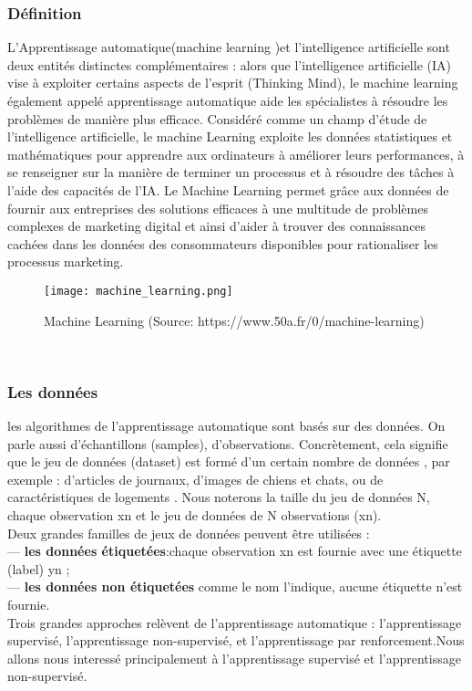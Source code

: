 \documentclass{article}
\begin{document}
\subsubsection{Définition}
L'Apprentissage automatique(machine learning )et l'intelligence artificielle sont deux entités distinctes complémentaires : alors que l'intelligence artificielle (IA) vise à exploiter certains aspects de l'esprit (Thinking Mind), le machine learning également appelé apprentissage automatique aide les spécialistes à résoudre les problèmes de manière plus efficace. Considéré comme un champ d'étude de l'intelligence artificielle, le machine Learning exploite les données statistiques et mathématiques pour apprendre aux ordinateurs à améliorer leurs performances, à se renseigner sur la manière de terminer un processus et à résoudre des tâches à l'aide des capacités de l'IA. Le Machine Learning permet grâce aux données de fournir aux entreprises des solutions efficaces à une multitude de problèmes complexes de marketing digital et ainsi d'aider à trouver des connaissances cachées dans les données des consommateurs disponibles pour rationaliser les processus marketing.
\begin{figure}[h]
   \texttt{[image: machine\_learning.png]}
   \caption{Machine Learning (Source: https://www.50a.fr/0/machine-learning)}
\end{figure} \\
\subsubsection{Les données}
les algorithmes de l’apprentissage automatique sont basés sur des données. On parle aussi d’échantillons (samples), d’observations. Concrètement, cela signifie que le jeu de données (dataset) est formé d’un certain nombre de données , par exemple :  d’articles de journaux, d’images de chiens et chats,  ou de caractéristiques de logements . Nous noterons la taille du jeu
de données N, chaque observation xn et le jeu de données de N observations (xn).\\
Deux grandes familles de jeux de données peuvent être utilisées :\\
— \textbf{les données étiquetées}:chaque observation xn est fournie avec une étiquette (label) yn ;\\
— \textbf{les données non étiquetées}  comme le nom l’indique, aucune étiquette n’est fournie.\\
Trois grandes approches relèvent de l’apprentissage automatique : l’apprentissage supervisé, l’apprentissage non-supervisé, et l’apprentissage par renforcement.Nous allons nous interessé principalement à l’apprentissage supervisé et l’apprentissage non-supervisé.
\end{document}
